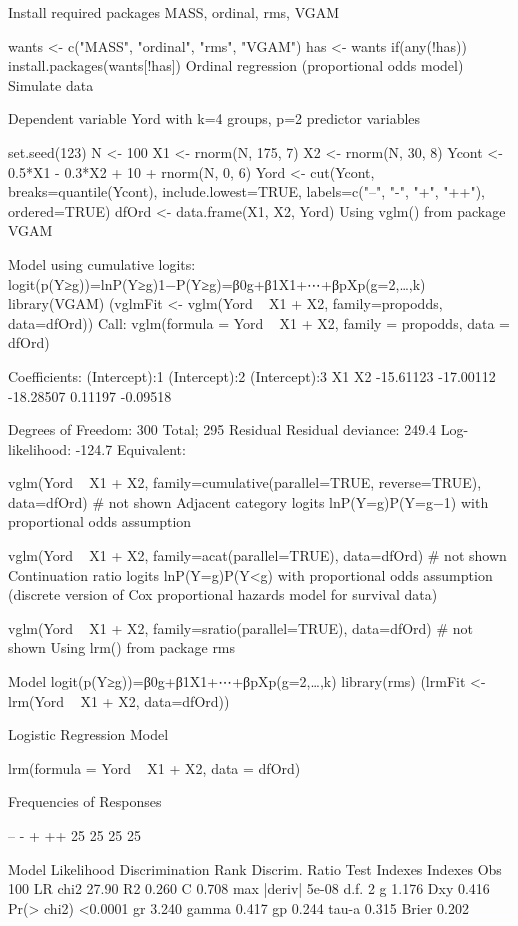 Install required packages
MASS, ordinal, rms, VGAM

wants <- c("MASS", "ordinal", "rms", "VGAM")
has   <- wants %
if(any(!has)) install.packages(wants[!has])
Ordinal regression (proportional odds model)
Simulate data

Dependent variable Yord with k=4 groups, p=2 predictor variables

set.seed(123)
N     <- 100
X1    <- rnorm(N, 175, 7)
X2    <- rnorm(N,  30, 8)
Ycont <- 0.5*X1 - 0.3*X2 + 10 + rnorm(N, 0, 6)
Yord  <- cut(Ycont, breaks=quantile(Ycont), include.lowest=TRUE,
             labels=c("--", "-", "+", "++"), ordered=TRUE)
dfOrd <- data.frame(X1, X2, Yord)
Using vglm() from package VGAM

Model using cumulative logits: logit(p(Y≥g))=lnP(Y≥g)1−P(Y≥g)=β0g+β1X1+⋯+βpXp(g=2,…,k)
library(VGAM)
(vglmFit <- vglm(Yord ~ X1 + X2, family=propodds, data=dfOrd))
Call:
vglm(formula = Yord ~ X1 + X2, family = propodds, data = dfOrd)

Coefficients:
(Intercept):1 (Intercept):2 (Intercept):3            X1            X2 
    -15.61123     -17.00112     -18.28507       0.11197      -0.09518 

Degrees of Freedom: 300 Total; 295 Residual
Residual deviance: 249.4 
Log-likelihood: -124.7 
Equivalent:

vglm(Yord ~ X1 + X2, family=cumulative(parallel=TRUE, reverse=TRUE), data=dfOrd)
# not shown
Adjacent category logits lnP(Y=g)P(Y=g−1) with proportional odds assumption

vglm(Yord ~ X1 + X2, family=acat(parallel=TRUE), data=dfOrd)
# not shown
Continuation ratio logits lnP(Y=g)P(Y<g) with proportional odds assumption (discrete version of Cox proportional hazards model for survival data)

vglm(Yord ~ X1 + X2, family=sratio(parallel=TRUE), data=dfOrd)
# not shown
Using lrm() from package rms

Model logit(p(Y≥g))=β0g+β1X1+⋯+βpXp(g=2,…,k)
library(rms)
(lrmFit <- lrm(Yord ~ X1 + X2, data=dfOrd))

Logistic Regression Model

lrm(formula = Yord ~ X1 + X2, data = dfOrd)

Frequencies of Responses

--  -  + ++ 
25 25 25 25 

                      Model Likelihood     Discrimination    Rank Discrim.    
                         Ratio Test            Indexes          Indexes       
Obs           100    LR chi2      27.90    R2       0.260    C       0.708    
max |deriv| 5e-08    d.f.             2    g        1.176    Dxy     0.416    
                     Pr(> chi2) <0.0001    gr       3.240    gamma   0.417    
                                           gp       0.244    tau-a   0.315    
                                           Brier    0.202                     

